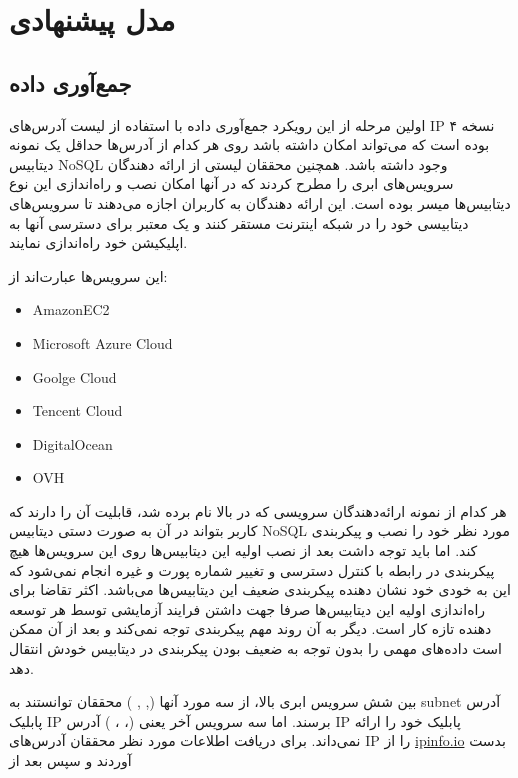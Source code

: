 \documentclass[10pt, a4paper]{article}
\begin{document}
\section{مدل پیشنهادی}

\subsection{جمع‌آوری داده}

اولین مرحله از این رویکرد جمع‌آوری داده با استفاده از لیست آدرس‌های IP نسخه ۴
بوده است که می‌تواند امکان داشته باشد روی هر کدام از آدرس‌ها حداقل یک نمونه
دیتابیس NoSQL وجود داشته باشد. همچنین محققان لیستی از ارائه دهندگان سرویس‌های
ابری را مطرح کردند که در آنها امکان نصب و راه‌اندازی این نوع دیتابیس‌ها میسر
بوده است. این ارائه دهندگان به کاربران اجازه می‌دهند تا سرویس‌های دیتابیسی خود
را در شبکه اینترنت مستقر کنند و یک  معتبر برای دسترسی آنها
به اپلیکیشن‌ خود راه‌اندازی نمایند.

این سرویس‌ها عبارت‌اند از:

\begin{LTR}
    \begin{itemize}
        \item AmazonEC2
        \item Microsoft Azure Cloud
        \item Goolge Cloud
        \item Tencent Cloud
        \item DigitalOcean
        \item OVH
    \end{itemize}
\end{LTR}

هر کدام از نمونه ارائه‌دهندگان سرویسی که در بالا نام برده شد، قابلیت آن را دارند
که کاربر بتواند در آن به صورت دستی دیتابیس NoSQL مورد نظر خود را نصب و پیکربندی
کند. اما باید توجه داشت بعد از نصب اولیه این دیتابیس‌ها روی این سرویس‌ها هیچ
پیکربندی در رابطه با کنترل دسترسی و تغییر شماره پورت و غیره انجام نمی‌شود که این
به خودی خود نشان دهنده پیکربندی ضعیف این دیتابیس‌ها می‌باشد. اکثر تقاضا برای
راه‌اندازی اولیه این دیتابیس‌ها صرفا جهت داشتن فرایند آزمایشی توسط هر توسعه
دهنده تازه کار است. دیگر به آن روند مهم پیکربندی توجه نمی‌کند و بعد از آن ممکن
است داده‌های مهمی را بدون توجه به ضعیف بودن پیکربندی در دیتابیس خودش انتقال دهد.

بین شش  سرویس ابری بالا، از سه مورد آنها (, , ) محققان توانستند به subnet آدرس پابلیک IP برسند.
اما سه سرویس آخر یعنی (، ، ) آدرس IP
پابلیک خود را ارائه نمی‌داند.
برای دریافت اطلاعات مورد نظر محققان آدرس‌های IP را از
\href{https://ipinfo.io}{ipinfo.io} بدست آوردند و سپس بعد از 
\end{document}
